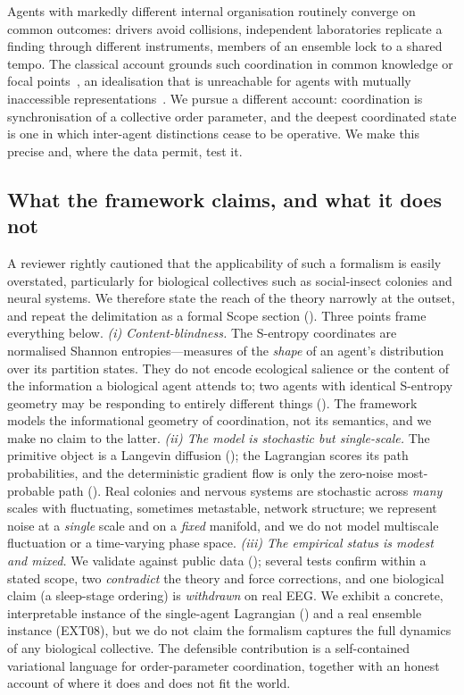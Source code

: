 \documentclass[11pt,twocolumn,a4paper]{article}
\begin{document}
Agents with markedly different internal organisation routinely converge on
common outcomes: drivers avoid collisions, independent laboratories replicate a
finding through different instruments, members of an ensemble lock to a shared
tempo. The classical account grounds such coordination in common
knowledge or focal points~\cite{lewis1969,schelling1960,aumann1976}, an
idealisation that is unreachable for agents with mutually inaccessible
representations~\cite{fagin1995}. We pursue a different account: coordination is
synchronisation of a collective order parameter, and the deepest coordinated
state is one in which inter-agent distinctions cease to be operative. We make
this precise and, where the data permit, test it.

\subsection{What the framework claims, and what it does not}
\label{sec:applicability}

A reviewer rightly cautioned that the applicability of such a formalism is easily
overstated, particularly for biological collectives such as social-insect
colonies and neural systems. We therefore state the reach of the theory narrowly
at the outset, and repeat the delimitation as a formal Scope section
(). Three points frame everything below.
\emph{(i) Content-blindness.} The S-entropy coordinates are normalised Shannon
entropies---measures of the \emph{shape} of an agent's distribution over its
partition states. They do not encode ecological salience or the content of the
information a biological agent attends to; two agents with identical S-entropy
geometry may be responding to entirely different things
(). The framework models the informational geometry of
coordination, not its semantics, and we make no claim to the latter.
\emph{(ii) The model is stochastic but single-scale.} The primitive object is a
Langevin diffusion (); the Lagrangian scores its path
probabilities, and the deterministic gradient flow is only the zero-noise
most-probable path (). Real colonies and nervous
systems are stochastic across \emph{many} scales with fluctuating, sometimes
metastable, network structure; we represent noise at a \emph{single} scale and on
a \emph{fixed} manifold, and we do not model multiscale fluctuation or a
time-varying phase space.
\emph{(iii) The empirical status is modest and mixed.} We validate against public
data (); several tests confirm within a stated scope, two
\emph{contradict} the theory and force corrections, and one biological claim
(a sleep-stage ordering) is \emph{withdrawn} on real EEG. We exhibit a concrete,
interpretable instance of the single-agent Lagrangian
() and a real ensemble instance (EXT08), but we do
not claim the formalism captures the full dynamics of any biological collective.
The defensible contribution is a self-contained variational language for
order-parameter coordination, together with an honest account of where it does
and does not fit the world.
\end{document}
